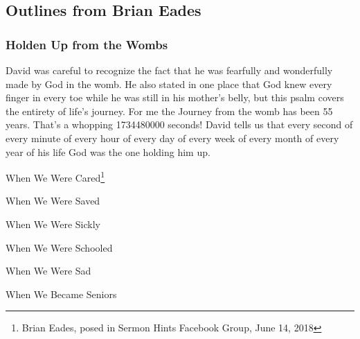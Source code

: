 \subsection{Outlines from Brian Eades}

\subsubsection{Holden Up from the Wombs}
David was careful to recognize the fact that he was fearfully and wonderfully made by God in the womb. He also stated in one place that God knew every finger in every toe while he was still in his mother's belly, but this psalm covers the entirety of life's journey. For me the Journey from the womb has been 55 years. That's a whopping 1734480000 seconds! David tells us that every second of every minute of every hour of every day of every week of every month of every year of his life God was the one holding him up.


\begin{compactenum}[I.][7]
    \item When We Were Cared\footnote{Brian Eades, posed in Sermon Hints Facebook Group, June 14, 2018}
    \item When We Were Saved
    \item When We Were Sickly
    \item When We Were Schooled
    \item When We Were Sad
    \item When We Became Seniors
\end{compactenum}